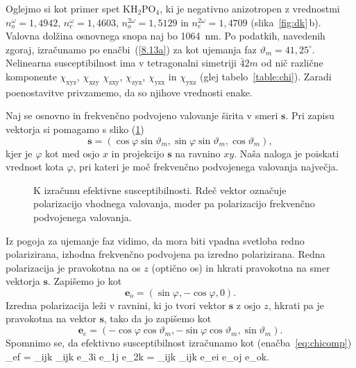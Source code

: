 Oglejmo si kot primer spet KH$_{2}$PO$_{4}$, ki je negativno anizotropen 
z vrednostmi $n_o^{\omega} = 1,4942$, 
$n_e^{\omega} = 1,4603$, $n_o^{2\omega} = 1,5129$ in $n_e^{2\omega} = 1,4709$
(slika~\ref{fig:dk}\,b). Valovna dolžina osnovnega snopa naj bo 1064~nm. 
Po podatkih, navedenih zgoraj, izračunamo po enačbi~(\ref{8.13a}) za kot ujemanja faz 
$\vartheta_m = 41,25^\circ$. Nelinearna susceptibilnost ima v tetragonalni
simetriji $\bar{4}2m$ od nič različne komponente $\chi_\textrm{xyz}$, $\chi_\textrm{xzy}$
$\chi_\textrm{zxy}$, $\chi_\textrm{zyx}$, $\chi_\textrm{yzx}$ in $\chi_\textrm{yxz}$
(glej tabelo~\ref{table:chi}). 
Zaradi poenostavitve privzamemo, da so njihove vrednosti enake. 

Naj se osnovno in frekvenčno podvojeno valovanje širita 
v smeri $\mathbf{s}$. Pri zapisu vektorja si pomagamo 
s sliko (\ref{fig:chi})
\begin{equation}
\mathbf{s}=(\cos\varphi\sin\vartheta_m,\sin\varphi\sin\vartheta_m,\cos\vartheta_m),
\label{8.14}
\end{equation}
kjer je $\varphi$ kot med osjo $x$ in projekcijo $\mathbf{s}$ na ravnino
$xy$. Naša naloga je poiskati vrednost kota $\varphi$, pri kateri je 
moč frekvenčno podvojenega valovanja največja.
\begin{figure}[h]
\centering
\def\svgwidth{70truemm} 

\caption{K izračunu efektivne susceptibilnosti. Rdeč vektor označuje
polarizacijo vhodnega valovanja, moder pa polarizacijo frekvenčno podvojenega valovanja.}
\label{fig:chi}
\end{figure}
Iz pogoja za ujemanje faz vidimo, da mora biti vpadna svetloba redno polarizirana, 
izhodna frekvenčno podvojena pa izredno polarizirana. Redna polarizacija je pravokotna na 
os $z$ (optično os) in hkrati pravokotna na smer vektorja $\mathbf{s}$. Zapišemo jo kot
\begin{equation}
\mathbf{e}_o=(\sin\varphi,-\cos\varphi,0).
\label{8.15}
\end{equation}
Izredna polarizacija leži v ravnini, ki jo tvori vektor $\mathbf{s}$ z osjo $z$,
hkrati pa je pravokotna na vektor $\mathbf{s}$, 
tako da jo zapišemo kot 
\begin{equation}
\mathbf{e}_e=(-\cos \varphi \cos \vartheta_m,-\sin \varphi \cos \vartheta_m ,\sin \vartheta_m).
\label{8.15a}
\end{equation}
Spomnimo se, da efektivno susceptibilnost izračunamo kot (enačba~\ref{eq:chicomp})
\beq
\chi_{ef} = \sum_{ijk} \chi_{ijk} e_{3i} e_{1j} e_{2k} = \sum_{ijk} \chi_{ijk} e_{ei} e_{oj} e_{ok}.
